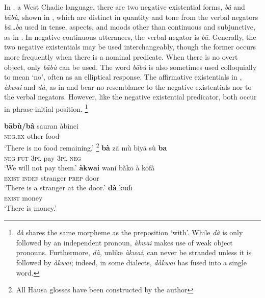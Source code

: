 \documentclass[output=paper]{langsci/langscibook}
\begin{document}
In , a West Chadic language, there are two negative existential
forms, \textit{bâ} and \textit{b\=ab\`u}, shown in ,
which are distinct in quantity and tone from the verbal negators
\textit{b\=a\ldots{}ba} used in tense, aspects, and moods other than continuous
and subjunctive, as in .  In negative continuous
utterances, the verbal negator is \textit{b\=a}. Generally, the two
negative existentials may be used interchangeably, though the former occurs
more frequently when there is a nominal predicate. When there is no overt
object, only \textit{b\=ab\`u} can be used. The word \textit{b\=ab\`u} is
also sometimes used colloquially to mean `no', often as an elliptical
response.  The affirmative existentials in
, \textit{\`a{}kwai} and \textit{d\`a}, as in 
and  bear no resemblance to the
negative existentials nor to the verbal negators. However, like the
negative existential predicator, both occur in phrase-initial position.%
%
\footnote{\textit{d\`a} shares the same morpheme as the preposition `with'.
While \textit{d\`a} is only followed by an independent pronoun, \textit{\`akwai} makes use of weak object pronouns. Furthermore, \textit{d\`a}, unlike \textit{\`akwai}, can never be stranded unless it is followed by \textit{\`akwai}; indeed, in some dialects, \textit{d\`akwai} has fused into a single word.}

\ea {}\label{ex:hausa-remain-pay-stranger-money}
  \ea \label{ex:hausa-remain}
  	\gll \textbf{bābù/bâ} sauran àbinci\\
  	\textsc{neg.ex} other food\\
  	\glt ‘There is no food remaining.’ \footnote{All Hausa glosses have been constructed by the author}
  \ex \label{ex:hausa-pay}
  	\gll \textbf{bà} zā mù biyā sù \textbf{ba}\\
  	\textsc{neg} \textsc{fut} 3\textsc{pl} pay 3\textsc{pl} \textsc{neg}\\
    \glt `We will not pay them.'
  \ex \label{ex:hausa-stranger}
  	\gll \textbf{àkwai} wani bā̀kō à kōfā̀ \\
  	\textsc{exist} \textsc{indef} stranger \textsc{prep} door\\
    \glt `There is a stranger at the door.'
  \ex \label{ex:hausa-money}
  	\gll \textbf{dà} kuɗɪ\\
  	\textsc{exist} money\\
  	\glt `There is money.'
\z \z
\end{document}
